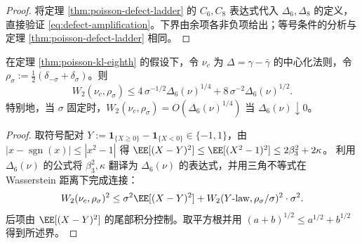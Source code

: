 \begin{proof}
将定理 \ref{thm:poisson-defect-ladder} 的 \(C_6,C_8\) 表达式代入 \(\Delta_6,\Delta_8\) 的定义，直接验证 \eqref{eq:defect-amplification}。下界由余项各非负项给出；等号条件的分析与定理 \ref{thm:poisson-defect-ladder} 相同。
\end{proof}

\begin{theorem}[对称二点法则的定量刚性]\label{thm:poisson-defect-stability}
在定理 \ref{thm:poisson-kl-eighth} 的假设下，令 \(\nu_c\) 为 \(\Delta=\gamma-\bar\gamma\) 的中心化法则，令 \(\rho_\sigma:=\frac12(\delta_{-\sigma}+\delta_\sigma)\)。则
\[
W_2(\nu_c,\rho_\sigma)
\le
4\,\sigma^{-1/2}\Delta_6(\nu)^{1/4}
+8\,\sigma^{-2}\Delta_6(\nu)^{1/2}.
\]
特别地，当 \(\sigma\) 固定时，\(W_2(\nu_c,\rho_\sigma)=O(\Delta_6(\nu)^{1/4})\) 当 \(\Delta_6(\nu)\downarrow 0\)。
\end{theorem}

\begin{proof}
取符号配对 \(Y:=\mathbf{1}_{\{X\ge 0\}}-\mathbf{1}_{\{X<0\}}\in\{-1,1\}\)，由 \(|x-\operatorname{sgn}(x)|\le|x^2-1|\) 得
\(\EE[(X-Y)^2]\le \EE[(X^2-1)^2]\le 2\beta_3^2+2\kappa\)。
利用 \(\Delta_6(\nu)\) 的公式将 \(\beta_3^2,\kappa\) 翻译为 \(\Delta_6(\nu)\) 的表达式，并用三角不等式在 Wasserstein 距离下完成连接：
\[
W_2(\nu_c,\rho_\sigma)^2
\le \sigma^2\EE[(X-Y)^2]+W_2(Y\text{-law},\rho_\sigma/\sigma)^2\cdot\sigma^2.
\]
后项由 \(\EE[(X-Y)^2]\) 的尾部积分控制。取平方根并用 \((a+b)^{1/2}\le a^{1/2}+b^{1/2}\) 得到所述界。
\end{proof}
